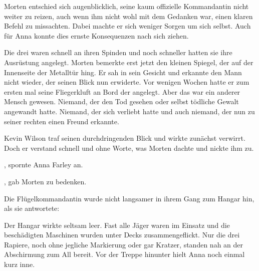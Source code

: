\par

Morten entschied sich augenblicklich, seine kaum offizielle Kommandantin nicht weiter zu reizen, auch wenn ihm nicht wohl mit dem Gedanken war, einen klaren Befehl zu missachten. Dabei machte er sich weniger Sorgen um sich selbst. Auch für Anna konnte dies ernste Konsequenzen nach sich ziehen.

\par

Die drei waren schnell an ihren Spinden und noch schneller hatten sie ihre Ausrüstung angelegt. Morten bemerkte erst jetzt den kleinen Spiegel, der auf der Innenseite der Metalltür hing. Er sah in sein Gesicht und erkannte den Mann nicht wieder, der seinen Blick nun erwiderte. Vor wenigen Wochen hatte er zum ersten mal seine Fliegerkluft an Bord der  angelegt. Aber das war ein anderer Mensch gewesen. Niemand, der den Tod gesehen oder selbst tödliche Gewalt angewandt hatte. Niemand, der sich verliebt hatte und auch niemand, der nun zu seiner rechten einen Freund erkannte.

\par

Kevin Wilson traf seinen durchdringenden Blick und wirkte zunächst verwirrt. Doch er verstand schnell und ohne Worte, was Morten dachte und nickte ihm zu.

\par

, spornte Anna Farley an. 

\par

, gab Morten zu bedenken.

\par

Die Flügelkommandantin wurde nicht langsamer in ihrem Gang zum Hangar hin, als sie antwortete: 

\par

Der Hangar wirkte seltsam leer. Fast alle Jäger waren im Einsatz und die beschädigten Maschinen wurden unter Decks zusammengeflickt. Nur die drei Rapiere, noch ohne jegliche Markierung oder gar Kratzer, standen nah an der Abschirmung zum All bereit. Vor der Treppe hinunter hielt Anna noch einmal kurz inne.

